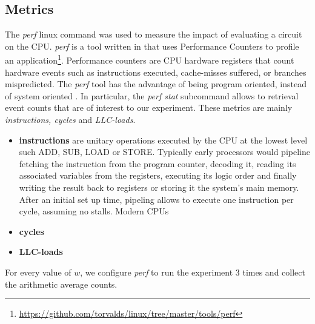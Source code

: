 \subsection{Metrics}
The \textit{perf} linux command was used to measure the impact of evaluating a circuit on the CPU. \textit{perf} is a tool written in  that uses Performance Counters to profile an application\footnote{\url{https://github.com/torvalds/linux/tree/master/tools/perf}}. Performance counters are CPU hardware registers that count hardware events such as instructions executed, cache-misses suffered, or branches mispredicted\cite{perfwiki}. The \textit{perf} tool has the advantage of being program oriented, instead of system oriented \cite{ibm}.   In particular, the \textit{perf stat} subcommand allows to retrieval event counts that are of interest to our experiment. These metrics are mainly \textit{instructions, cycles} and \textit{LLC-loads}. 
\begin{itemize}
\item \textbf{instructions} are unitary operations executed by the CPU at the lowest level such ADD, SUB, LOAD or STORE. Typically early processors would pipeline fetching the instruction from the program counter, decoding it, reading its associated variables from the registers, executing its logic order and finally writing the result back to registers or storing it the system's main memory\cite{jmor}. After an initial set up time, pipeling allows to execute one instruction per cycle, assuming no stalls. Modern CPUs 
\item \textbf{cycles}
\item \textbf{LLC-loads}
\end{itemize}
For every value of $w$, we configure \textit{perf} to run the experiment 3 times and collect the arithmetic average counts.





